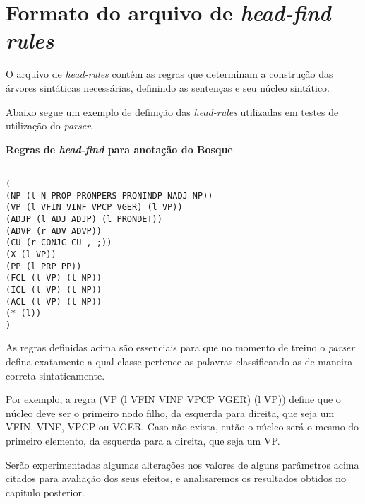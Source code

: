\section{Formato do arquivo de \emph{head-find rules}}
\label{sec:bikel_formato_aqrquivo_head_find}


O arquivo de \emph{head-rules} contém as regras que determinam a construção das árvores sintáticas necessárias, definindo as sentenças e seu núcleo sintático.

Abaixo segue um exemplo de definição das \emph{head-rules} utilizadas em testes de utilização do \emph{parser}.

\textbf{Regras de \emph{head-find} para anotação do Bosque}

\scriptsize

\begin{verbatim}

(
(NP (l N PROP PRONPERS PRONINDP NADJ NP))
(VP (l VFIN VINF VPCP VGER) (l VP))
(ADJP (l ADJ ADJP) (l PRONDET))
(ADVP (r ADV ADVP))
(CU (r CONJC CU , ;))
(X (l VP))
(PP (l PRP PP))
(FCL (l VP) (l NP))
(ICL (l VP) (l NP))
(ACL (l VP) (l NP))
(* (l))
)
\end{verbatim}

\normalsize

As regras definidas acima são essenciais para que no momento de treino o \emph{parser} defina exatamente a qual classe pertence as palavras classificando-as de maneira correta sintaticamente.

Por exemplo, a regra (VP (l VFIN VINF VPCP VGER) (l VP)) define que o núcleo deve ser o primeiro nodo filho, da esquerda para direita, que seja um VFIN, VINF, VPCP ou VGER. Caso não exista, então o núcleo será o mesmo do primeiro elemento, da esquerda para a direita, que seja um VP.

Serão experimentadas algumas alterações nos valores de alguns parâmetros acima citados para avaliação dos seus efeitos, e analisaremos os resultados obtidos no capitulo posterior.

